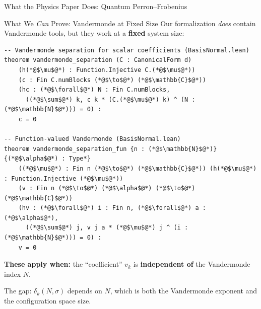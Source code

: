 \documentclass[aspectratio=169,10pt]{beamer}
\begin{document}
\begin{frame}{What the Physics Paper Does: Quantum Perron--Frobenius}
\vspace{0.3em}
\begin{center}
\end{center}
\end{frame}

\begin{frame}[fragile]{What We \emph{Can} Prove: Vandermonde at Fixed Size}
\vspace{-0.5em}
{\small Our formalization \emph{does} contain Vandermonde tools, but they work at a \textbf{fixed} system size:}

\vspace{0.1em}
\begin{lstlisting}[basicstyle=\ttfamily\fontsize{5}{6.5}\selectfont\color{white}]
-- Vandermonde separation for scalar coefficients (BasisNormal.lean)
theorem vandermonde_separation (C : CanonicalForm d)
    (h(*@$\mu$@*) : Function.Injective C.(*@$\mu$@*))
    (c : Fin C.numBlocks (*@$\to$@*) (*@$\mathbb{C}$@*))
    (hc : (*@$\forall$@*) N : Fin C.numBlocks,
      ((*@$\sum$@*) k, c k * (C.(*@$\mu$@*) k) ^ (N : (*@$\mathbb{N}$@*))) = 0) :
    c = 0

-- Function-valued Vandermonde (BasisNormal.lean)
theorem vandermonde_separation_fun {n : (*@$\mathbb{N}$@*)} {(*@$\alpha$@*) : Type*}
    ((*@$\mu$@*) : Fin n (*@$\to$@*) (*@$\mathbb{C}$@*)) (h(*@$\mu$@*) : Function.Injective (*@$\mu$@*))
    (v : Fin n (*@$\to$@*) (*@$\alpha$@*) (*@$\to$@*) (*@$\mathbb{C}$@*))
    (hv : (*@$\forall$@*) i : Fin n, (*@$\forall$@*) a : (*@$\alpha$@*),
      ((*@$\sum$@*) j, v j a * (*@$\mu$@*) j ^ (i : (*@$\mathbb{N}$@*))) = 0) :
    v = 0
\end{lstlisting}

\vspace{0.05em}
{\small\textbf{These apply when:} the ``coefficient'' $v_k$ is \textbf{independent of} the Vandermonde index $N$.}

\vspace{0.15em}
{\small The gap: $\delta_k(N, \sigma)$ depends on $N$, which is both the Vandermonde exponent and the configuration space size.}

\vspace{0.1em}
{\small{}\quad{}}
\end{frame}
\end{document}
